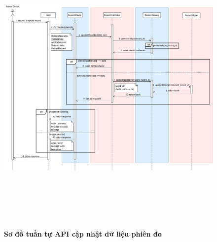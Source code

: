 \begin{figure}[H]
	\centering
	\includegraphics[width=15cm,height=15cm]{Images/api_sequence/record/updateRecordById.drawio.png}
	\caption[Sơ đồ tuần tự API cập nhật dữ liệu phiên đo]{\bfseries \fontsize{12pt}{0pt}\selectfont Sơ đồ tuần tự API cập nhật dữ liệu phiên đo}
	\label{sequence_diagram_update_record}
\end{figure}

